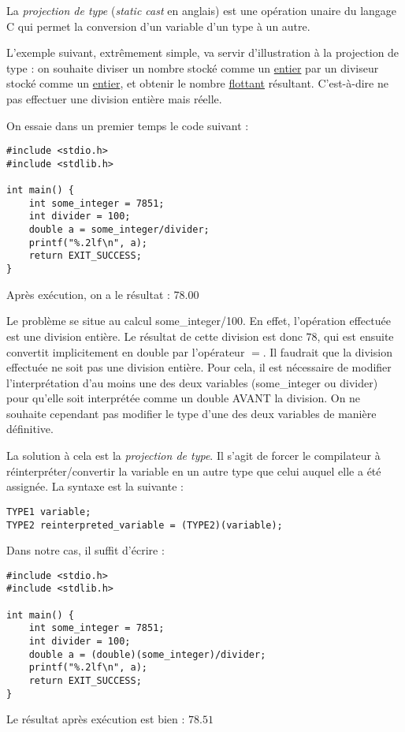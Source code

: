 \documentclass[../../../main.tex]{subfiles}
\begin{document}
La \textit{projection de type} (\textit{static cast} en anglais) est une opération unaire du langage C qui permet la conversion d'un variable d'un type à un autre.
 
L'exemple suivant, extrêmement simple, va servir d'illustration à la projection de type : on souhaite diviser un nombre stocké comme un \underline{entier} par un diviseur stocké comme un \underline{entier}, et obtenir le nombre \underline{flottant} résultant. C'est-à-dire ne pas effectuer une division entière mais réelle.
 
On essaie dans un premier temps le code suivant :
\begin{verbatim}
#include <stdio.h>
#include <stdlib.h>

int main() {
	int some_integer = 7851;
	int divider = 100;
	double a = some_integer/divider;
	printf("%.2lf\n", a);
	return EXIT_SUCCESS;
}
\end{verbatim}
Après exécution, on a le résultat : \textsf{78.00}
 
Le problème se situe au calcul \textsf{some\_integer/100}. En effet, l'opération effectuée est une division entière. Le résultat de cette division est donc $78$, qui est ensuite convertit implicitement en \textsf{double} par l'opérateur $=$. \newline
Il faudrait que la division effectuée ne soit pas une division entière. Pour cela, il est nécessaire de modifier l'interprétation d'au moins une des deux variables (\textsf{some\_integer} ou \textsf{divider}) pour qu'elle soit interprétée comme un \textsf{double} AVANT la division. On ne souhaite cependant pas modifier le type d'une des deux variables de manière définitive.
 
La solution à cela est la \textit{projection de type}. Il s'agit de forcer le compilateur à réinterpréter/convertir la variable en un autre type que celui auquel elle a été assignée. La syntaxe est la suivante :
\begin{verbatim}
TYPE1 variable;
TYPE2 reinterpreted_variable = (TYPE2)(variable);
\end{verbatim}
Dans notre cas, il suffit d'écrire :
\begin{verbatim}
#include <stdio.h>
#include <stdlib.h>

int main() {
	int some_integer = 7851;
	int divider = 100;
	double a = (double)(some_integer)/divider;
	printf("%.2lf\n", a);
	return EXIT_SUCCESS;
}
\end{verbatim}
Le résultat après exécution est bien : $78.51$
 
\end{document}
